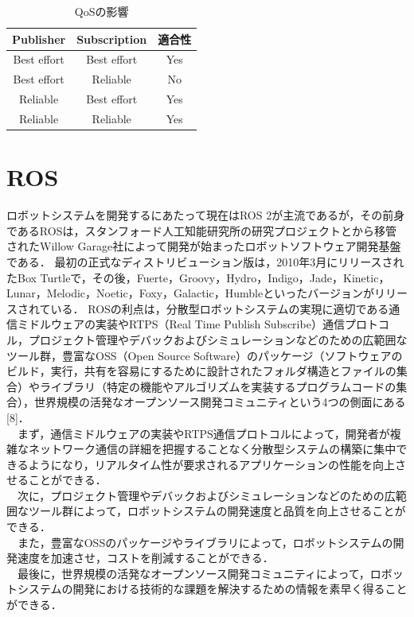 \begin{table}[ht]
    \caption{QoSの影響}
    \label{tab:qos}
    \centering
    \begin{tabular}{|c|c|c|} \hline
      Publisher & Subscription & 適合性 \\ \hline
      Best effort & Best effort & Yes \\ \hline
      Best effort & Reliable & No \\ \hline
      Reliable & Best effort & Yes \\ \hline
      Reliable & Reliable & Yes \\ \hline
    \end{tabular}
  \end{table}
\section{ROS}
ロボットシステムを開発するにあたって現在はROS 2が主流であるが，その前身であるROSは，スタンフォード人工知能研究所の研究プロジェクトとから移管されたWillow Garage社によって開発が始まったロボットソフトウェア開発基盤である．
最初の正式なディストリビューション版は，2010年3月にリリースされたBox Turtleで，その後，Fuerte，Groovy，Hydro，Indigo，Jade，Kinetic，Lunar，Melodic，Noetic，Foxy，Galactic，Humbleといったバージョンがリリースされている．
ROSの利点は，分散型ロボットシステムの実現に適切である通信ミドルウェアの実装やRTPS（Real Time Publish Subscribe）通信プロトコル，プロジェクト管理やデバックおよびシミュレーションなどのための広範囲なツール群，豊富なOSS（Open Source Software）のパッケージ（ソフトウェアのビルド，実行，共有を容易にするために設計されたフォルダ構造とファイルの集合）やライブラリ（特定の機能やアルゴリズムを実装するプログラムコードの集合），世界規模の活発なオープンソース開発コミュニティという4つの側面にある[8]．\\
　まず，通信ミドルウェアの実装やRTPS通信プロトコルによって，開発者が複雑なネットワーク通信の詳細を把握することなく分散型システムの構築に集中できるようになり，リアルタイム性が要求されるアプリケーションの性能を向上させることができる．
\\　次に，プロジェクト管理やデバックおよびシミュレーションなどのための広範囲なツール群によって，ロボットシステムの開発速度と品質を向上させることができる．
\\　また，豊富なOSSのパッケージやライブラリによって，ロボットシステムの開発速度を加速させ，コストを削減することができる．
\\　最後に，世界規模の活発なオープンソース開発コミュニティによって，ロボットシステムの開発における技術的な課題を解決するための情報を素早く得ることができる．
